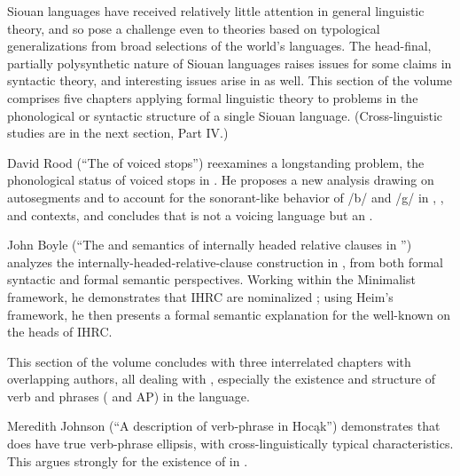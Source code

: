 \begin{refsection}

Siouan languages have received relatively little attention in general linguistic theory, and so pose a challenge even to theories based on typological generalizations from broad selections of the world's languages. The head-final, partially polysynthetic nature of Siouan languages raises issues for some claims in syntactic theory, and interesting issues arise in  as well. This section of the volume comprises five chapters applying formal linguistic theory to problems in the phonological or syntactic structure of a single Siouan language. (Cross-linguistic studies are in the next section, Part IV.)

David Rood (``The  of  voiced stops'') reexamines a longstanding problem, the phonological status of voiced stops in . He proposes a new analysis drawing on autosegments and  to account for the sonorant-like behavior of /b/ and /g/ in , , and  contexts, and concludes that  is not a voicing language but an . 

John Boyle (``The  and semantics of internally headed relative clauses in '') analyzes the internally-headed-relative-clause construction in , from both formal syntactic and formal semantic perspectives. Working within the Minimalist framework, he demonstrates that  IHRC are nominalized ; using Heim's framework, he then presents a formal semantic explanation for the well-known  on the heads of IHRC. 

This section of the volume concludes with three interrelated chapters with overlapping authors, all dealing with  , especially the existence and structure of verb and  phrases ( and AP) in the language.

Meredith Johnson (``A description of verb-phrase  in Hoc\k{a}k'') demonstrates that  does have true verb-phrase ellipsis, with cross-linguistically typical characteristics. This argues strongly for the existence of  in .


\end{refsection}

